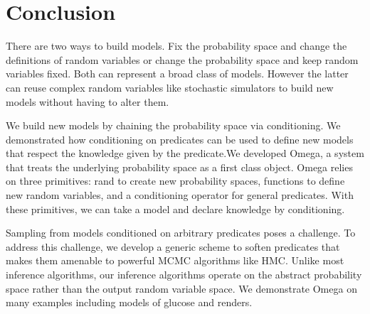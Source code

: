 
\section{Conclusion}
There are two ways to build models. Fix the probability space and change the definitions of random variables or change the probability space and keep random variables fixed. Both can represent a broad class of models. However the latter can 
reuse complex random variables like stochastic simulators to build new models without having to alter them.

We build new models by chaining the probability space via
conditioning. We demonstrated how conditioning on predicates can be
used to define new models that respect the knowledge given by the predicate.We developed Omega, a system that treats the underlying probability
space as a first class object. Omega relies on three primitives:
rand to create new probability spaces, functions to define new random variables, and a conditioning operator for general predicates. With these primitives, we can take a model and declare knowledge by conditioning. 

Sampling from models conditioned on arbitrary predicates poses a challenge. To address this challenge, we develop a generic scheme to soften predicates that makes them amenable to powerful MCMC algorithms like HMC. Unlike most inference algorithms, our inference algorithms operate on the abstract probability space rather than the output random variable space. 
We demonstrate Omega on many examples including models of glucose and renders.





